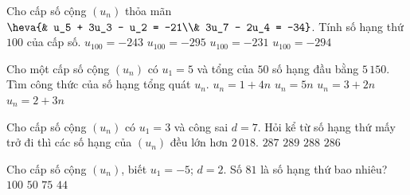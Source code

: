 \begin{ex}%
	Cho cấp số cộng $(u_n)$ thỏa mãn $\heva{& u_5 + 3u_3 - u_2 = -21\\& 3u_7 -  2u_4 = -34}$. Tính số hạng thứ $100$ của cấp số.
	 \choice
		{$u_{100} = -243$} 
		{\True $u_{100} = -295$} 
		{$u_{100} = -231$} 
		 {$u_{100} = -294$}
\end{ex}

\begin{ex}%
	Cho một cấp số cộng $(u_n)$ có $u_1=5$ và tổng của $50$ số hạng đầu bằng $5\,150$. Tìm  công thức của số hạng tổng quát $u_n$.
	\choice 
		{\True $u_n=1+4n$} 
		 {$u_n=5n$}
		 {$u_n=3+2n$}
		 {$u_n=2+3n$}
\end{ex}

\begin{ex}%
	Cho cấp số  cộng $(u_n)$ có $u_1=3$ và công sai $d=7$. Hỏi kể từ số hạng thứ mấy trở đi thì các số hạng của $(u_n)$ đều lớn hơn $2\,018$.
	 \choice
		{$287$} 
		{\True  $289$}
		{$288$} 
		 {$286$}
\end{ex}

\begin{ex}%
	Cho cấp số cộng $(u_n)$,  biết $u_1 = -5$; $d = 2$. Số $81$ là số hạng thứ bao nhiêu?
	 \choice
		{$100$} 
		{$50$} 
		 {$75$}
		{\True  $44$}
\end{ex}

